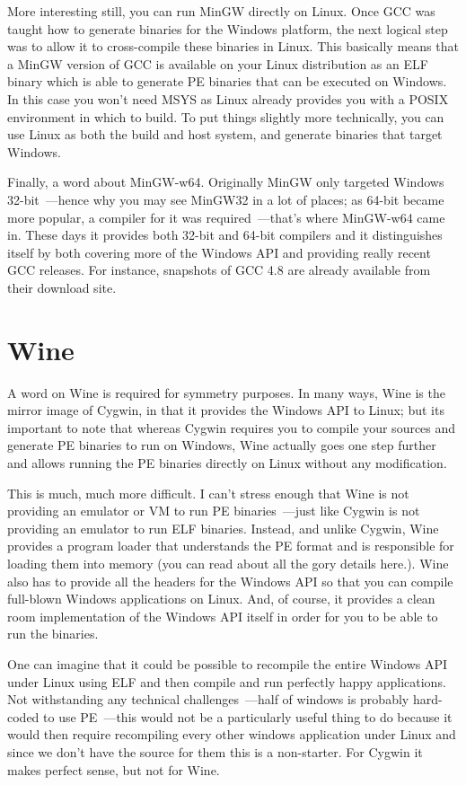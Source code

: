 \documentclass{book}
\begin{document}
More interesting still, you can run MinGW directly on Linux. Once GCC
was taught how to generate binaries for the Windows platform, the next
logical step was to allow it to cross-compile these binaries in
Linux. This basically means that a MinGW version of GCC is available
on your Linux distribution as an ELF binary which is able to generate
PE binaries that can be executed on Windows. In this case you won't
need MSYS as Linux already provides you with a POSIX environment in
which to build. To put things slightly more technically, you can use
Linux as both the build and host system, and generate binaries that
target Windows.

Finally, a word about MinGW-w64. Originally MinGW only targeted
Windows 32-bit~---hence why you may see MinGW32 in a lot of places; as
64-bit became more popular, a compiler for it was required~---that's
where MinGW-w64 came in. These days it provides both 32-bit and 64-bit
compilers and it distinguishes itself by both covering more of the
Windows API and providing really recent GCC releases. For instance,
snapshots of GCC 4.8 are already available from their download site.

\section{Wine}

A word on Wine is required for symmetry purposes. In many ways, Wine
is the mirror image of Cygwin, in that it provides the Windows API to
Linux; but its important to note that whereas Cygwin requires you to
compile your sources and generate PE binaries to run on Windows, Wine
actually goes one step further and allows running the PE binaries
directly on Linux without any modification.

This is much, much more difficult. I can't stress enough that Wine is
not providing an emulator or VM to run PE binaries~---just like Cygwin
is not providing an emulator to run ELF binaries. Instead, and unlike
Cygwin, Wine provides a program loader that understands the PE format
and is responsible for loading them into memory (you can read about
all the gory details here.). Wine also has to provide all the headers
for the Windows API so that you can compile full-blown Windows
applications on Linux. And, of course, it provides a clean room
implementation of the Windows API itself in order for you to be able
to run the binaries.

One can imagine that it could be possible to recompile the entire
Windows API under Linux using ELF and then compile and run perfectly
happy applications. Not withstanding any technical challenges~---half
of windows is probably hard-coded to use PE~---this would not be a
particularly useful thing to do because it would then require
recompiling every other windows application under Linux and since we
don't have the source for them this is a non-starter. For Cygwin it
makes perfect sense, but not for Wine.
\end{document}
